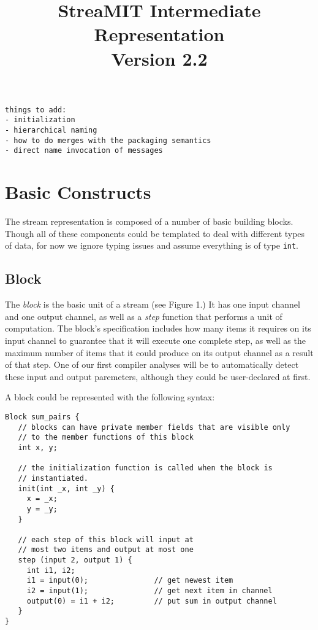 \title{StreaMIT Intermediate Representation \\ Version 2.2}


\maketitle

\begin{verbatim}
things to add:
- initialization
- hierarchical naming 
- how to do merges with the packaging semantics
- direct name invocation of messages
\end{verbatim}

\section{Basic Constructs}

The stream representation is composed of a number of basic building
blocks.  Though all of these components could be templated to deal with
different types of data, for now we ignore typing issues and assume
everything is of type {\tt int}.

\subsection{Block}

The {\em block} is the basic unit of a stream (see Figure 1.)  It has
one input channel and one output channel, as well as a {\em step}
function that performs a unit of computation.  The block's specification
includes how many items it requires on its input channel to guarantee
that it will execute one complete step, as well as the maximum number of
items that it could produce on its output channel as a result of that
step.  One of our first compiler analyses will be to automatically
detect these input and output paremeters, although they could be
user-declared at first.

A block could be represented with the following syntax:

\begin{verbatim}
Block sum_pairs {
   // blocks can have private member fields that are visible only
   // to the member functions of this block
   int x, y;

   // the initialization function is called when the block is 
   // instantiated.
   init(int _x, int _y) {
     x = _x;
     y = _y;
   }

   // each step of this block will input at 
   // most two items and output at most one
   step (input 2, output 1) {
     int i1, i2;
     i1 = input(0);               // get newest item
     i2 = input(1);               // get next item in channel
     output(0) = i1 + i2;         // put sum in output channel
   }
}
\end{verbatim}

